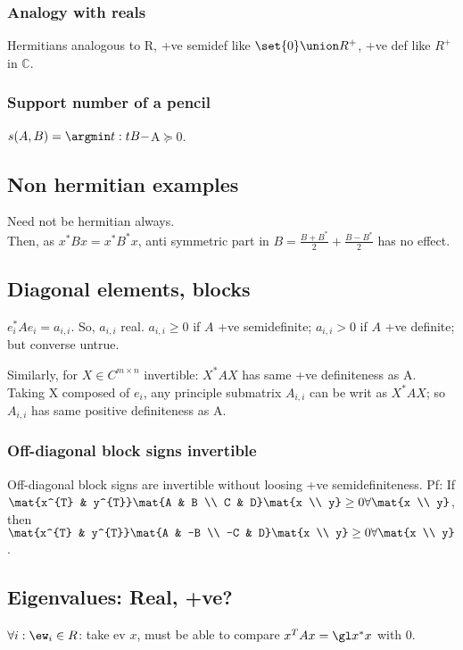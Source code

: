 \documentclass[oneside, article]{memoir}
\begin{document}
\subsubsection{Analogy with reals}
Hermitians analogous to R, +ve semidef like $\set{0} \union R^{+}$, +ve def like $R^{+}$ in $\mathbb{C}$.

\subsubsection{Support number of a pencil}
$s(A, B) = \argmin t: tB - $A$ \succeq 0$.

\subsection{Non hermitian examples}
Need not be hermitian always. \\
Then, as $x^{*}Bx = x^{*}B^{*}x$, anti symmetric part in $B = \frac{B+B^{*}}{2} + \frac{B-B^{*}}{2}$ has no effect.

\subsection{Diagonal elements, blocks}
$e_{i}^{*}Ae_{i} = a_{i,i}$. So, $a_{i,i}$ real. $a_{i,i} \geq 0$ if $A$ +ve semidefinite; $a_{i,i}> 0$ if $A$ +ve definite; but converse untrue.

Similarly, for $X \in C^{m\times n}$ invertible: $X^{*}AX$ has same +ve definiteness as A. Taking X composed of $e_{i}$, any principle submatrix $A_{i,i}$ can be writ as $X^{*}AX$; so $A_{i,i}$ has same positive definiteness as A.

\subsubsection{Off-diagonal block signs invertible}
Off-diagonal block signs are invertible without loosing +ve semidefiniteness. Pf: If $\mat{x^{T} & y^{T}}\mat{A & B \\ C & D}\mat{x \\ y} \geq 0 \forall \mat{x \\ y}$, then $\mat{x^{T} & y^{T}}\mat{A & -B \\ -C & D}\mat{x \\ y} \geq 0 \forall \mat{x \\ y}$.



\subsection{Eigenvalues: Real, +ve?}
$\forall i: \ew_i \in R$: take ev $x$, must be able to compare $x^{T}Ax = \gl x^{*}x$ with 0.
\end{document}
